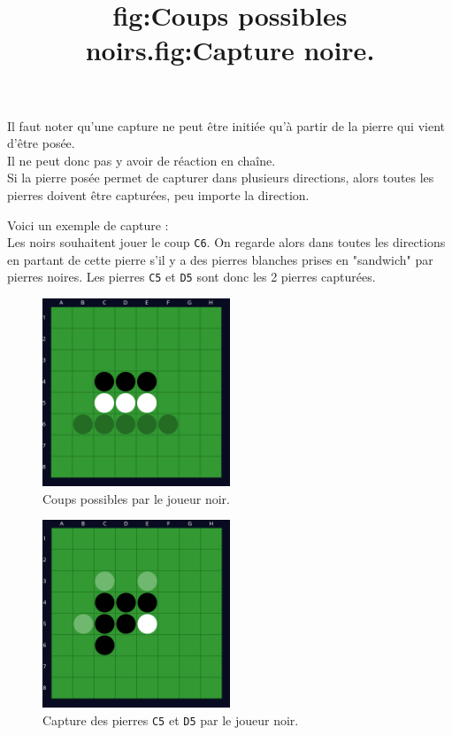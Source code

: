 \documentclass[a4paper,12pt]{article}
\begin{document}
\vspace{0.4cm}

Il faut noter qu’une capture ne peut être initiée qu’à partir de la pierre qui
vient d’être posée. \\ Il ne peut donc pas y avoir de réaction en chaîne. \\ Si
la pierre posée permet de capturer dans plusieurs directions, alors toutes les
pierres doivent être capturées, peu importe la direction.

\vspace{0.4cm}

\newpage

Voici un exemple de capture : \\

Les noirs souhaitent jouer le coup \texttt{C6}. On regarde alors dans toutes
les directions en partant de cette pierre s'il y a des pierres blanches prises
en "sandwich" par pierres noires. Les pierres \texttt{C5} et \texttt{D5} sont
donc les 2 pierres capturées.

\begin{figure}[h]
    \centering
    \includegraphics[width=0.5\textwidth]{images/othello_rules_before_move.png}
    \caption{Coups possibles par le joueur noir.}
    \title{fig:Coups possibles noirs.}
\end{figure}

\begin{figure}[h]
    \centering
    \includegraphics[width=0.5\textwidth]{images/othello_rules_after_move.png}
    \caption{Capture des pierres \texttt{C5} et \texttt{D5} par le joueur noir.}
    \title{fig:Capture noire.}
\end{figure}
\end{document}
